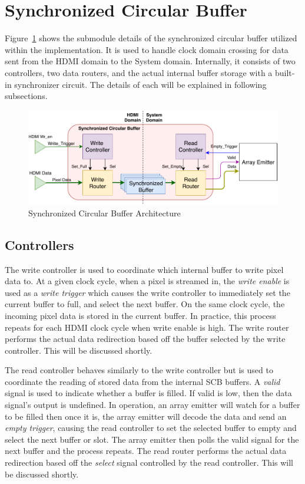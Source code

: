 \section{Synchronized Circular Buffer}

    Figure~\ref{fig:scb_arch} shows the submodule details of the synchronized circular buffer utilized within the implementation. It is used to handle clock domain crossing for data sent from the HDMI domain to the System domain. Internally, it consists of two controllers, two data routers, and the actual internal buffer storage with a built-in synchronizer circuit. The details of each will be explained in following subsections.

    \begin{figure}
        \centering
        \includegraphics[width=1.0\textwidth]{fig/pdp_scb_arch.pdf}
        \caption{Synchronized Circular Buffer Architecture}
        \label{fig:scb_arch}
    \end{figure}

    \subsection{Controllers}
        The write controller is used to coordinate which internal buffer to write pixel data to. At a given clock cycle, when a pixel is streamed in, the {\it write enable} is used as a {\it write trigger} which causes the write controller to immediately set the current buffer to full, and select the next buffer. On the same clock cycle, the incoming pixel data is stored in the current buffer. In practice, this process repeats for each HDMI clock cycle when write enable is high. The write router performs the actual data redirection based off the buffer selected by the write controller. This will be discussed shortly.

        The read controller behaves similarly to the write controller but is used to coordinate the reading of stored data from the internal SCB buffers. A {\it valid} signal is used to indicate whether a buffer is filled. If valid is low, then the data signal's output is undefined. In operation, an array emitter will watch for a buffer to be filled then once it is, the array emitter will decode the data and send an {\it empty trigger}, causing the read controller to set the selected buffer to empty and select the next buffer or slot. The array emitter then polls the valid signal for the next buffer and the process repeats. The read router performs the actual data redirection based off the {\it select} signal controlled by the read controller. This will be discussed shortly.

